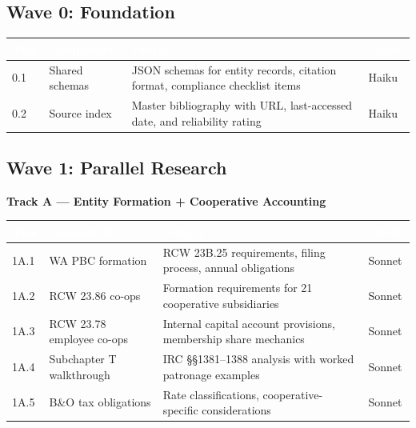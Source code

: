 \documentclass[11pt,letterpaper]{article}
\newcommand{\tableheader}[1]{\textbf{\sffamily\textcolor{white}{#1}}}
\begin{document}
\subsection{Wave 0: Foundation}

\begin{center}
\begin{tabularx}{\textwidth}{C{0.8cm}L{3cm}XC{1.5cm}}
\toprule
{}
\tableheader{Task} & \tableheader{Component} & \tableheader{Output} & \tableheader{Model} \\
 & Shared schemas & JSON schemas for entity records, citation format, compliance checklist items & Haiku \\
0.2 & Source index & Master bibliography with URL, last-accessed date, and reliability rating & Haiku \\
\bottomrule
\end{tabularx}
\end{center}

\subsection{Wave 1: Parallel Research}

\textbf{Track A --- Entity Formation + Cooperative Accounting}

\begin{center}
\begin{tabularx}{\textwidth}{C{0.8cm}L{3cm}XC{1.5cm}}
\toprule
{}
\tableheader{Task} & \tableheader{Component} & \tableheader{Output} & \tableheader{Model} \\
\midrule
1A.1 & WA PBC formation & RCW 23B.25 requirements, filing process, annual obligations & Sonnet \\
1A.2 & RCW 23.86 co-ops & Formation requirements for 21 cooperative subsidiaries & Sonnet \\
1A.3 & RCW 23.78 employee co-ops & Internal capital account provisions, membership share mechanics & Sonnet \\
1A.4 & Subchapter T walkthrough & IRC \S\S 1381--1388 analysis with worked patronage examples & Sonnet \\
1A.5 & B\&O tax obligations & Rate classifications, cooperative-specific considerations & Sonnet \\
\bottomrule
\end{tabularx}
\end{center}
\end{document}
